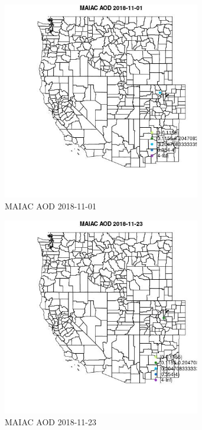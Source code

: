 \begin{figure} 
\centering  
\includegraphics[width=0.77\textwidth]{Code_Outputs/Report_ML_input_PM25_Step4_part_e_de_duplicated_aves_MapObsMAIAC_AOD2018-11-01.jpg} 
\caption{\label{fig:Report_ML_input_PM25_Step4_part_e_de_duplicated_avesMapObsMAIAC_AOD2018-11-01}MAIAC AOD 2018-11-01} 
\end{figure} 
 

\begin{figure} 
\centering  
\includegraphics[width=0.77\textwidth]{Code_Outputs/Report_ML_input_PM25_Step4_part_e_de_duplicated_aves_MapObsMAIAC_AOD2018-11-23.jpg} 
\caption{\label{fig:Report_ML_input_PM25_Step4_part_e_de_duplicated_avesMapObsMAIAC_AOD2018-11-23}MAIAC AOD 2018-11-23} 
\end{figure} 
 

